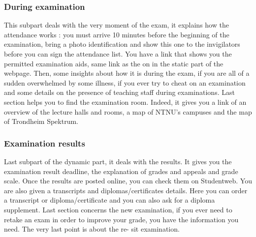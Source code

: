 \subsubsection{During examination}

This subpart deals with the very moment of the exam, it explains how the attendance works : 
you must arrive 10 minutes before the beginning of the examination, bring a photo 
identification and show this one to the invigilators before you can sign the attendance list.
You have a link that shows you the permitted examination aids, same link as the on in the 
static part of the webpage.
Then, some insights about how it is during the exam, if you are all of a sudden overwhelmed 
by some illness, if you ever try to cheat on an examination and some details on the presence 
of teaching staff during examinations.
Last section helps you to find the examination room. Indeed, it gives you a link of an 
overview of the lecture halls and rooms, a map of NTNU's campuses and the map of 
Trondheim Spektrum.

\subsubsection{Examination results}

Last subpart of the dynamic part, it deals with the results. It gives you the examination result 
deadline, the explanation of grades and appeals and grade scale. Once the results are posted 
online, you can check them on Studentweb.
You are also given a transcripts and diplomas/certificates details. Here you can order a 
transcript or diploma/certificate and you can also ask for a diploma supplement.
Last section concerns the new examination, if you ever need to retake an exam in order to 
improve your grade, you have the information you need. The very last point is about the re-
sit examination.